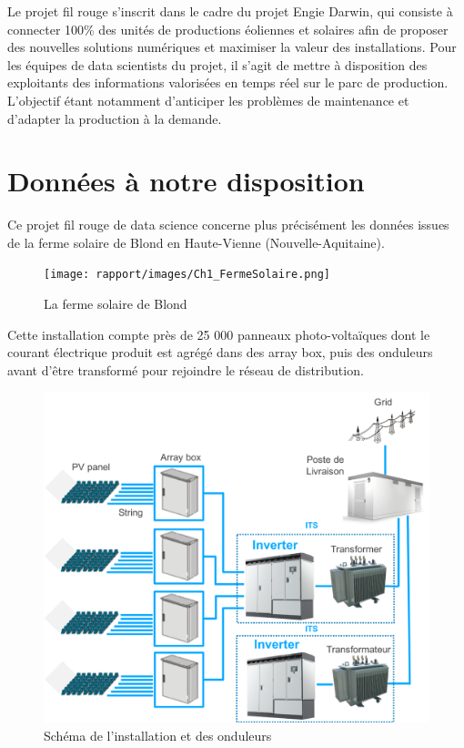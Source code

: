 Le projet fil rouge s'inscrit dans le cadre du projet Engie Darwin, qui consiste à connecter 100\% des unités de productions éoliennes et solaires afin de proposer des nouvelles solutions numériques et maximiser la valeur des installations. Pour les équipes de data scientists du projet, il s'agit de mettre à disposition des exploitants des informations valorisées en temps réel sur le parc de production. L'objectif étant notamment d'anticiper les problèmes de maintenance et d'adapter la production à la demande.

\section{Données à notre disposition}
Ce projet fil rouge de data science concerne plus précisément les données issues de la ferme solaire de Blond en Haute-Vienne (Nouvelle-Aquitaine).

\begin{figure}[!ht]
\begin{center}
\texttt{[image: rapport/images/Ch1\_FermeSolaire.png]}
\end{center}
\caption{La ferme solaire de Blond}
\end{figure}
\FloatBarrier

Cette installation compte près de 25 000 panneaux photo-voltaïques dont le courant électrique produit est agrégé dans des array box, puis des onduleurs avant d'être transformé pour rejoindre le réseau de distribution.

\begin{figure}[!ht]
\begin{center}
\includegraphics[scale=0.4]{rapport/images/Ch1_Onduleurs.png}
\end{center}
\caption{Schéma de l'installation et des onduleurs}
\end{figure}
\FloatBarrier

